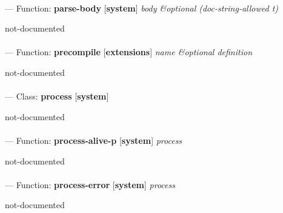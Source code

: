 \paragraph{}
\label{SYSTEM:PARSE-BODY}
--- Function: \textbf{parse-body} [\textbf{system}] \textit{body \&optional (doc-string-allowed t)}

\begin{adjustwidth}{5em}{5em}
not-documented
\end{adjustwidth}

\paragraph{}
\label{EXTENSIONS:PRECOMPILE}
--- Function: \textbf{precompile} [\textbf{extensions}] \textit{name \&optional definition}

\begin{adjustwidth}{5em}{5em}
not-documented
\end{adjustwidth}

\paragraph{}
\label{SYSTEM:PROCESS}
--- Class: \textbf{process} [\textbf{system}] \textit{}

\begin{adjustwidth}{5em}{5em}
not-documented
\end{adjustwidth}

\paragraph{}
\label{SYSTEM:PROCESS-ALIVE-P}
--- Function: \textbf{process-alive-p} [\textbf{system}] \textit{process}

\begin{adjustwidth}{5em}{5em}
not-documented
\end{adjustwidth}

\paragraph{}
\label{SYSTEM:PROCESS-ERROR}
--- Function: \textbf{process-error} [\textbf{system}] \textit{process}

\begin{adjustwidth}{5em}{5em}
not-documented
\end{adjustwidth}

